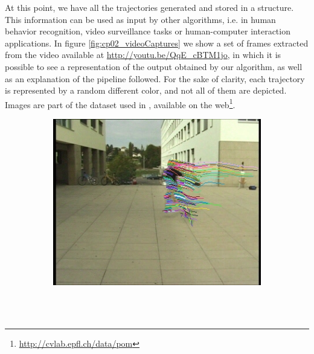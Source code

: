 At this point, we have all the trajectories generated and stored in a structure. This information can be used as 
input by other algorithms, i.e. in human behavior recognition, video surveillance tasks or human-computer 
interaction applications. In figure \ref{fig:cp02_videoCaptures} we show a set of frames extracted from the video available at \url{http://youtu.be/QqE_cBTM1jo}, in which it is possible to see a representation of the output obtained by our 
algorithm, as well as an explanation of the pipeline followed. For the sake of clarity, each trajectory is represented by a random different color, and not all of them 
are depicted. Images are part of the dataset used in \cite{berclaz2011multiple}, available on the 
web\footnote{\url{http://cvlab.epfl.ch/data/pom}}.

\begin{figure}[t]
        \centering
        \begin{subfigure}[b]{0.24\textwidth}
                \centering
                \includegraphics[width=\textwidth, trim=6 0 5 1, clip]{fig5.jpg}
                \caption{~}
                \label{fig:cp02_videoCapture1}
        \end{subfigure}%
        ~ %
        \begin{subfigure}[b]{0.24\textwidth}
                \centering

\end{subfigure}
\end{figure}

